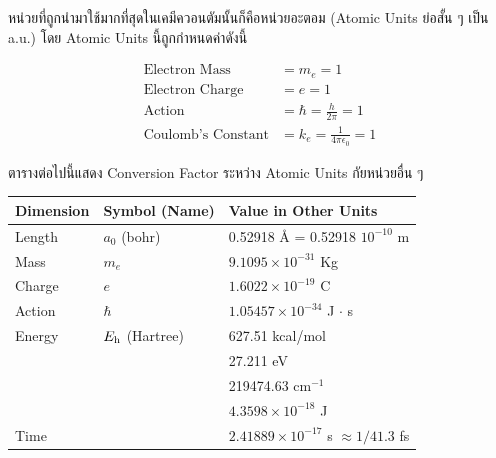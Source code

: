 หน่วยที่ถูกนำมาใช้มากที่สุดในเคมีควอนตัมนั้นก็คือหน่วยอะตอม (Atomic Units ย่อสั้น ๆ เป็น a.u.) โดย Atomic Units นี้ถูกกำหนดค่าดังนี้

\begin{align}
    \text{Electron Mass}      & = m_{e} = 1                             \\
    \text{Electron Charge}    & = e = 1                                 \\
    \text{Action}             & = \hbar = \frac{h}{2\pi} = 1            \\
    \text{Coulomb's Constant} & = k_{e} = \frac{1}{4\pi \epsilon_0} = 1
\end{align}

ตารางต่อไปนี้แสดง Conversion Factor ระหว่าง Atomic Units กัยหน่วยอื่น ๆ

\begin{table}[htbp]
    \centering
    \begin{tabular}{lll}
        \toprule
        Dimension & Symbol (Name)         & Value in Other Units                            \\
        \midrule
        Length    & $a_0$ (bohr)          & 0.52918 \AA{} = 0.52918 $10^{-10}$ m            \\
        Mass      & $m_e$                 & $9.1095 \times 10^{-31}$ Kg                     \\
        Charge    & $e$                   & $1.6022 \times 10^{-19}$ C                      \\
        Action    & $\hbar$               & $1.05457 \times 10^{-34}$ J $\cdot$ s           \\
        Energy    & $E_{\rm h}$ (Hartree) & 627.51 kcal/mol                                 \\
                  &                       & 27.211 eV                                       \\
                  &                       & 219474.63 cm$^{-1}$                             \\
                  &                       & $4.3598 \times 10^{-18}$ J                      \\
        Time      &                       & $2.41889 \times 10^{-17}$ s $\approx 1/41.3$ fs \\
        \bottomrule
    \end{tabular}
    \label{tab:atomicunits}
\end{table}

